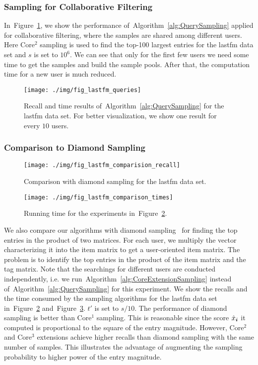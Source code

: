 \documentclass[letterpaper]{article}
\newcommand{\V}[1]{{\boldsymbol{{\MakeLowercase{#1}}}}}
\newcommand{\Fig}[1]{Figure~\ref{fig:#1}}
\newcommand{\Alg}[1]{Algorithm~\ref{alg:#1}}
\begin{document}
\subsubsection{Sampling for Collaborative Filtering}
In~\Fig{Queries}, we show the performance of~\Alg{QuerySampling} 
applied for collaborative filtering, 
where the samples are shared among different users. 
Here Core$^2$ sampling is used to find the top-100 largest entries for the lastfm data set
and $s$ is set to $10^6$. 
We can see that only for the first few users we need some time to get the samples 
and build the sample pools. 
After that, the computation time for a new user is much reduced.
\begin{figure}[!]
  \centering
  \texttt{[image: ./img/fig\_lastfm\_queries]}\\
  \caption{Recall and time results of~\Alg{QuerySampling} for the lastfm data set.
           For better visualization, we show one result for every $10$ users.}
  \label{fig:Queries}
\end{figure}
\subsubsection{Comparison to Diamond Sampling}
\begin{figure}[!ht]
  \centering
  \texttt{[image: ./img/fig\_lastfm\_comparision\_recall]}\\
  \caption{Comparison with diamond sampling for the lastfm data set.}
  \label{fig:Comparison_recall}
\end{figure}
\begin{figure}[!ht]
    \centering
    \texttt{[image: ./img/fig\_lastfm\_comparison\_times]}\\
    \caption{Running time for the experiments in~\Fig{Comparison_recall}.}
\label{fig:Comparison_time}
\end{figure}
We also compare our algorithms with diamond sampling~\cite{BaPiKoSe15} 
for finding the top entries in the product of two matrices. 
For each user, we multiply the vector characterizing it into the item matrix 
to get a user-oriented item matrix. 
The problem is to identify the top entries in the product of the item matrix and the tag matrix. 
Note that the searchings for different users are conducted independently,
i.e. we run~\Alg{CoreExtensionSampling} instead of~\Alg{QuerySampling} for this experiment.
We show the recalls and the time consumed by the sampling algorithms for the lastfm data set
in~\Fig{Comparison_recall} and~\Fig{Comparison_time}.
$t'$ is set to $s/10$. 
The performance of diamond sampling is better than Core$^1$ sampling.
This is reasonable since the score $\hat{x}_{\V{i}}$ it computed is proportional to the square of the entry magnitude. 
However, Core$^2$ and Core$^3$ extensions achieve higher recalls than diamond sampling with the same number of samples. 
This illustrates the advantage of augmenting the sampling probability to higher power of the entry magnitude.





\end{document}
